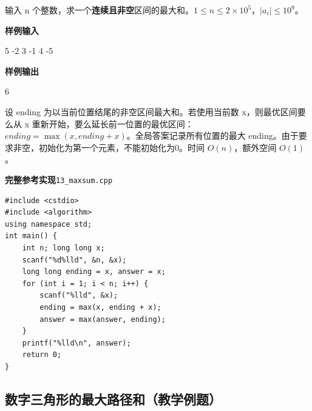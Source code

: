 \documentclass[UTF8,11pt,a4paper,fontset=none]{ctexart}
\begin{document}
输入 n 个整数，求一个\textbf{连续且非空}区间的最大和。$1\le n\le2\times10^5$，$|a_i|\le10^9$。
\begin{tcolorbox}[samplebox,title={输入输出样例}]
\textbf{样例输入}
\begin{Sample}
5
-2 3 -1 4 -5
\end{Sample}
\tcblower
\textbf{样例输出}
\begin{Sample}
6
\end{Sample}
\end{tcolorbox}
设 ending 为以当前位置结尾的非空区间最大和。若使用当前数 x，则最优区间要么从 x 重新开始，要么延长前一位置的最优区间：$ending=\max(x,ending+x)$。全局答案记录所有位置的最大 ending。由于要求非空，初始化为第一个元素，不能初始化为0。时间 $O(n)$，额外空间 $O(1)$。
\par\noindent\begin{minipage}{\linewidth}
\textbf{完整参考实现}\quad\texttt{13\_maxsum.cpp}
\begin{lstlisting}
#include <cstdio>
#include <algorithm>
using namespace std;
int main() {
    int n; long long x;
    scanf("%d%lld", &n, &x);
    long long ending = x, answer = x;
    for (int i = 1; i < n; i++) {
        scanf("%lld", &x);
        ending = max(x, ending + x);
        answer = max(answer, ending);
    }
    printf("%lld\n", answer);
    return 0;
}
\end{lstlisting}
\end{minipage}\par

\subsection{数字三角形的最大路径和（教学例题）}
\end{document}
